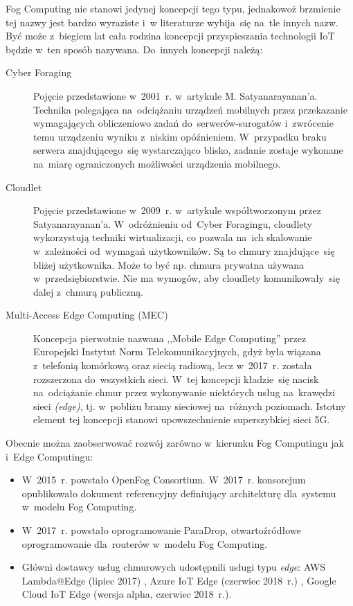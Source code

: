 \documentclass[12pt,a4paper,twoside,titlepage,openright]{book}
\begin{document}
Fog Computing nie stanowi jedynej koncepcji tego typu, jednakowoż brzmienie tej nazwy jest bardzo wyraziste i~w literaturze wybija~się na~tle innych nazw. Być może z~biegiem lat cała rodzina koncepcji przyspieszania technologii IoT będzie w~ten sposób nazywana. Do~innych koncepcji należą:
\begin{description}
\item [Cyber Foraging] Pojęcie przedstawione w~2001~r. w~artykule M. Satyanarayanan'a. Technika polegająca na~odciążaniu urządzeń mobilnych przez przekazanie wymagających obliczeniowo zadań do~serwerów-surogatów i~zwrócenie temu urządzeniu wyniku z~niskim opóźnieniem. W~przypadku braku serwera znajdującego~się wystarczająco blisko, zadanie zostaje wykonane na~miarę ograniczonych możliwości urządzenia mobilnego. \cite{fogArticle, fog5g}
\item [Cloudlet] Pojęcie przedstawione w~2009~r. w~artykule współtworzonym przez Satyanarayanan'a. W~odróżnieniu od~Cyber Foragingu, cloudlety wykorzystują techniki wirtualizacji, co pozwala na~ich skalowanie w~zależności od~wymagań użytkowników. Są to chmury znajdujące~się bliżej użytkownika. Może to być np. chmura prywatna używana w~przedsiębiorstwie. Nie ma wymogów, aby cloudlety komunikowały~się dalej z~chmurą publiczną. \cite{fogArticle, fog5g}
\item [Multi-Access Edge Computing (MEC)] Koncepcja pierwotnie nazwana ,,Mobile Edge Computing'' przez Europejski Instytut Norm Telekomunikacyjnych, gdyż była wiązana z~telefonią komórkową oraz siecią radiową, lecz w~2017~r. została rozszerzona do~wszystkich sieci. W~tej koncepcji kładzie~się nacisk na~odciążanie chmur przez wykonywanie niektórych usług na~krawędzi sieci \textit{(edge)}, tj. w~pobliżu bramy sieciowej na~różnych poziomach. Istotny element tej koncepcji stanowi upowszechnienie superszybkiej sieci 5G. \cite{fogArticle, fog5g}
\end{description}

Obecnie można zaobserwować rozwój zarówno w~kierunku Fog Computingu jak i~Edge Computingu:
\begin{itemize}
\item W~2015~r. powstało OpenFog Consortium. W~2017~r. konsorcjum opublikowało dokument referencyjny definiujący architekturę dla~systemu w~modelu Fog Computing. \cite{fogArticle, iotArchitects}
\item W~2017~r. powstało oprogramowanie ParaDrop, otwartoźródłowe oprogramowanie dla~routerów w~modelu Fog Computing. \cite{fog5g}
\item Główni dostawcy usług chmurowych udostępnili usługi typu \textit{edge}: AWS Lambda@Edge (lipiec 2017) \cite{siteAmazonLambdaEdge}, Azure IoT Edge (czerwiec 2018~r.) \cite{siteAzureIotEdge}, Google Cloud IoT Edge (wersja alpha, czerwiec 2018~r.)\cite{siteGoogleIotEdge}. 
\end{itemize}
\end{document}
